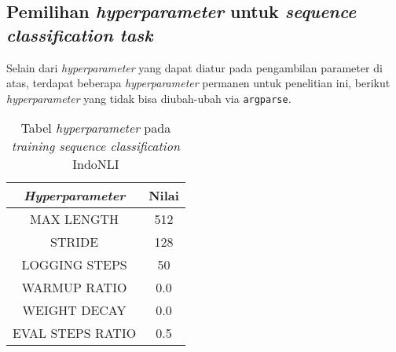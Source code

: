 \subsection{Pemilihan \emph{hyperparameter} untuk \emph{sequence classification task}}
Selain dari \emph{hyperparameter} yang dapat diatur pada pengambilan parameter di atas, terdapat beberapa \emph{hyperparameter} permanen untuk penelitian ini, berikut \emph{hyperparameter} yang tidak bisa diubah-ubah via \texttt{argparse}.

\begin{table}[h]
\centering
\begin{tabular}{||c | c||} 
 \hline
 \emph{Hyperparameter} & Nilai \\ [0.5ex] 
 \hline\hline
 MAX LENGTH & 512 \\ 
 STRIDE & 128 \\
 LOGGING STEPS & 50 \\
 WARMUP RATIO & 0.0 \\
 WEIGHT DECAY & 0.0 \\ 
 EVAL STEPS RATIO & 0.5 \\ [1ex] 
 \hline\hline
\end{tabular}
\caption{Tabel \emph{hyperparameter} pada \emph{training sequence classification} IndoNLI}
\end{table}

